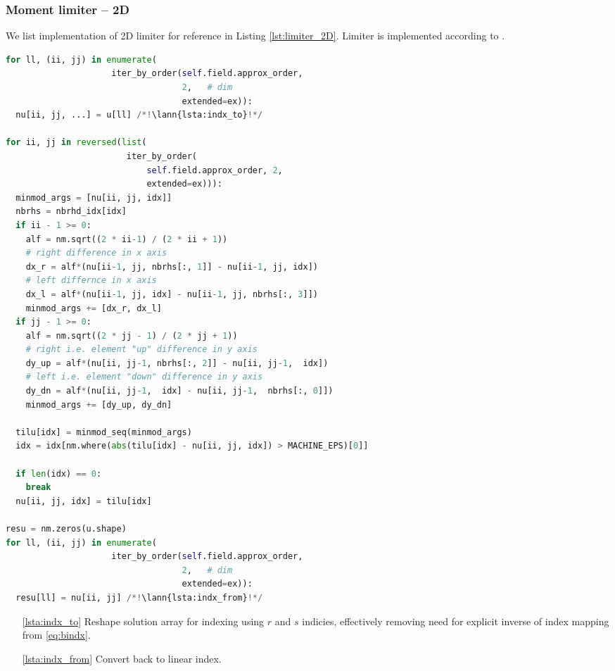 \subsubsection{Moment limiter -- 2D}
\label{se:i_moment_lim_2D}
We list implementation of 2D limiter for reference in Listing \ref{lst:limiter_2D}. Limiter is 
implemented according to .
\setcounter{lstannotation}{0}
\begin{lstlisting}[language=Python, caption=Moment limiter for 
cartesian grid \label{lst:limiter_2D}]
for ll, (ii, jj) in enumerate(
                     iter_by_order(self.field.approx_order, 
                                   2,   # dim
                                   extended=ex)):
  nu[ii, jj, ...] = u[ll] /*!\lann{lsta:indx_to}!*/

for ii, jj in reversed(list(
                        iter_by_order(
                            self.field.approx_order, 2,
                            extended=ex))):
  minmod_args = [nu[ii, jj, idx]]
  nbrhs = nbrhd_idx[idx]
  if ii - 1 >= 0:
    alf = nm.sqrt((2 * ii-1) / (2 * ii + 1))
    # right difference in x axis
    dx_r = alf*(nu[ii-1, jj, nbrhs[:, 1]] - nu[ii-1, jj, idx])
    # left differnce in x axis
    dx_l = alf*(nu[ii-1, jj, idx] - nu[ii-1, jj, nbrhs[:, 3]])
    minmod_args += [dx_r, dx_l]
  if jj - 1 >= 0:
    alf = nm.sqrt((2 * jj - 1) / (2 * jj + 1))
    # right i.e. element "up" difference in y axis
    dy_up = alf*(nu[ii, jj-1, nbrhs[:, 2]] - nu[ii, jj-1,  idx])
    # left i.e. element "down" difference in y axis
    dy_dn = alf*(nu[ii, jj-1,  idx] - nu[ii, jj-1,  nbrhs[:, 0]])
    minmod_args += [dy_up, dy_dn]

  tilu[idx] = minmod_seq(minmod_args)
  idx = idx[nm.where(abs(tilu[idx] - nu[ii, jj, idx]) > MACHINE_EPS)[0]]

  if len(idx) == 0:
    break
  nu[ii, jj, idx] = tilu[idx]

resu = nm.zeros(u.shape)
for ll, (ii, jj) in enumerate(
                     iter_by_order(self.field.approx_order, 
                                   2,   # dim
                                   extended=ex)):
  resu[ll] = nu[ii, jj] /*!\lann{lsta:indx_from}!*/
\end{lstlisting}
\begin{itemize}
    \item[\ref{lsta:indx_to}] Reshape solution array for indexing using $r$ and $s$ indicies, 
    effectively removing need for explicit inverse of index mapping from \eqref{eq:bindx}.
    \item [\ref{lsta:indx_from}] Convert back to linear index.
\end{itemize}


